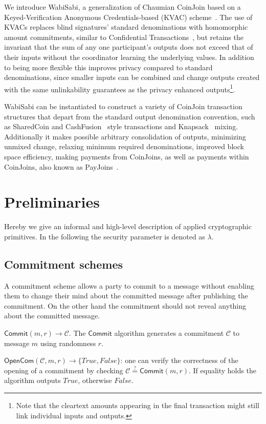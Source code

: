 \documentclass{article}
\begin{document}
We introduce WabiSabi, a generalization of Chaumian CoinJoin based on a Keyed-Verification Anonymous Credentials-based (KVAC) scheme~\cite{chase2019signal}. The use of KVACs replaces blind signatures' standard denominations with homomorphic amount commitments, similar to Confidential Transactions~\cite{maxwell2016confidential}, but retains the invariant that the sum of any one participant's outputs does not exceed that of their inputs without the coordinator learning the underlying values. In addition to being more flexible this improves privacy compared to standard denominations, since smaller inputs can be combined and change outputs created with the same unlinkability guarantees as the privacy enhanced outputs\footnote{Note that the cleartext amounts appearing in the final transaction might still link individual inputs and outputs.}.

WabiSabi can be instantiated to construct a variety of CoinJoin transaction structures that depart from the standard output denomination convention, such as SharedCoin and CashFusion~\cite{cashfusion} style transactions and Knapsack~\cite{maurer2017anonymous} mixing. Additionally it makes possible arbitrary consolidation of outputs, minimizing unmixed change, relaxing minimum required denominations, improved block space efficiency, making payments from CoinJoins, as well as payments within CoinJoins, also known as PayJoins~\cite{payjoin}.

\section{Preliminaries}

Hereby we give an informal and high-level description of applied cryptographic primitives. In the following the security parameter is denoted as $\lambda$.

\subsection{Commitment schemes}
A commitment scheme allows a party to commit to a message without enabling them to change their mind about the committed message after publishing the commitment. On the other hand the commitment should not reveal anything about the committed message.

\noindent$\mathsf{Commit}(m,r)\xrightarrow{}\mathcal{C}$. The $\mathsf{Commit}$ algorithm generates a commitment $\mathcal{C}$ to message $m$ using randomness $r$.

\noindent$\mathsf{OpenCom}(\mathcal{C},m,r)\xrightarrow{}\{\mathit{True},\mathit{False}\}$: one can verify the correctness of the opening of a commitment by checking $\mathcal{C}\stackrel{?}{=}\mathsf{Commit}(m,r)$. If equality holds the algorithm outputs $\mathit{True}$, otherwise $\mathit{False}$.
\end{document}
